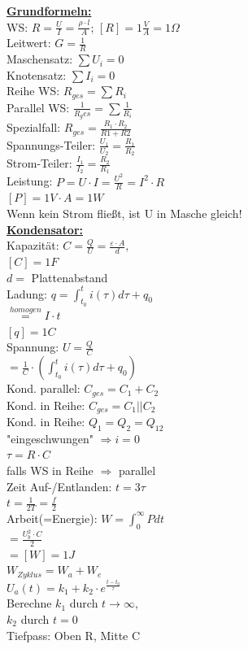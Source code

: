 \documentclass[11pt]{article}
\begin{document}
\begin{minipage}{0.33\textwidth}

\underline{\textbf{Grundformeln:}}\\
WS: $R = \frac{U}{I} = \frac{\rho \cdot l}{A}$; $[R] = 1\frac{V}{A} =1 \Omega$\\
Leitwert: $G = \frac{1}{R}$\\
Maschensatz: $\sum U_i = 0$\\
Knotensatz: $\sum I_i = 0$\\
Reihe WS: $R_{ges} = \sum R_i$\\
Parallel WS: $\frac{1}{R_ges} = \sum \frac{1}{R_i}$\\
\phantom{ss} Spezialfall: $R_{ges} = \frac{R_1 \cdot R_2}{R1+R2} $\\
Spannungs-Teiler: $\frac{U_1}{U_2} = \frac{R_1}{R_2}$\\
Strom-Teiler: $\frac{I_1}{I_2} = \frac{R_2}{R_1}$\\
Leistung: $P =U \cdot I = \frac{U^2}{R} = I^2 \cdot R $ \\
\phantom{ssssssssss} $[P] = 1V \cdot A =1 W$\\
Wenn kein Strom fließt, ist U in Masche gleich!\\

\underline{\textbf{Kondensator:}}\\
Kapazität: $C = \frac{Q}{U} = \frac{\varepsilon \cdot A }{d},$\\
\phantom{ssssssssssii} $[C]=1F$\\
\phantom{sssssssssssii} $d =$ Plattenabstand\\
Ladung: $q = \int_{t_0}^t i(\tau) d\tau + q_0$\\
\phantom{sssssssis} $\stackrel{homogen}{=} I \cdot t$\\
\phantom{ssssssssssii} $[q]=1C$\\
Spannung: $U = \frac{Q}{C}$\\
\phantom{ssi} $= \frac{1}{C} \cdot (\int_{t_0}^t i(\tau) d\tau + q_0)$\\
Kond. parallel: $C_{ges} = C_1 + C_2$\\
Kond. in Reihe: $C_{ges} = C_1 || C_2$\\
Kond. in Reihe: $Q_1 = Q_2 = Q_{12}$\\
"eingeschwungen" $\Rightarrow i = 0$\\
$\tau = R \cdot C$\\
\phantom{ss}falls WS in Reihe $\Rightarrow$ parallel\\
Zeit Auf-/Entlanden: $t = 3\tau$\\
$t =\frac{1}{2T} = \frac{f}{2}$\\
Arbeit(=Energie): $W = \int_0^\infty P dt$\\
\phantom{sssssssss} $= \frac{U_b^2 \cdot C}{2} $\\
\phantom{sssssssss} $= [W] = 1J $\\
$W_{Zyklus} = W_a + W_e$\\
$U_a(t) = k_1 + k_2 \cdot e^{\frac{t-t_0}{\tau}}$\\
Berechne $k_1$ durch $t \rightarrow \infty$,\\
$k_2$ durch $t = 0$\\

Tiefpass: Oben R, Mitte C
\end{minipage}%
\end{document}

